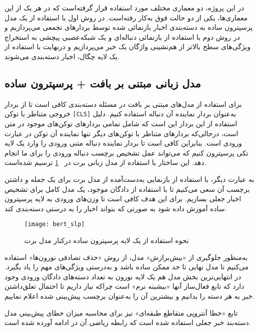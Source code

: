 در این پروژه، دو معماری مختلف مورد استفاده قرار گرفته‌است که در هر یک از این معماری‌ها، یکی از دو حالت فوق به‌کار رفته‌است. در روش اول با استفاده از یک مدل پرسپترون ساده به دسته‌بندی اخبار بازنمائی شده توسط بردار‌های تجمعی می‌پردازیم و در روش دوم با استفاده از بازنمائی دنباله‌ای و یک شبکه‌‌عصبی پیچشی به استخراج ویژگی‌های سطح بالاتر از هم‌نشینی واژگان یک خبر می‌پردازیم و درنهایت با استفاده از یک لایه چگال، اخبار دسته‌بندی می‌شوند.



\subsection{مدل زبانی مبتنی بر بافت + پرسپترون ساده}
برای استفاده از مدل‌‌های مبتنی بر بافت در مسئله دسته‌بندی کافی است تا از بردار خروجی متناظر با توکن \verb|[CLS]| به‌عنوان بردار نماینده آن دنباله استفاده کنیم. دلیل استفاده از این بردار این است که شامل تمامی بردارهای توکن‌های موجود در متن است، درحالی‌که بردارهای متناظر با توکن‌های دیگر تنها نماینده آن توکن در عبارت ورودی است. بنابراین کافی است تا بردار نماینده دنباله متنی ورودی را وارد یک لایه تکی پرسپترون کنیم که می‌تواند عمل تشخیص برچسب دنباله ورودی را برای ما انجام دهد. این ساختار با استفاده از مدل زبانی برت در \figurename~\ref{fig.bertSLP} ترسیم شده‌است.

به عبارت دیگر، با استفاده از بازنمایی به‌دست‌آمده از مدل برت برای یک جمله و داشتن برچسب آن سعی می‌کنیم تا با استفاده از  دادگان موجود، یک مدل کامل برای تشخیص اخبار جعلی بسازیم. برای این هدف کافی است تا وزن‌های ورودی به لایه پرسپترون  ساده آموزش داده شود به صورتی که بتواند اخبار را به درستی دسته‌بندی کند. 

\begin{figure}[!h]
\texttt{[image: bert\_slp]}
\centering
\caption{نحوه استفاده از یک لایه پرسپترون ساده درکنار مدل برت}
\label{fig.bertSLP}
\end{figure}
\noindent

به‌منظور جلوگیری از «بیش‌برازش» مدل، از روش «حذف تصادفی نورون‌ها» استفاده می‌کنیم تا مدل نهایی تا حد ممکن ساده باشد و به‌درستی ویژگی‌های مهم را یاد بگیرد. در انتهایی‌ترین بخش مدل هم یک لایه نورون به تعداد دسته‌های دادگان ورودی وجود دارد که تابع فعال‌ساز آنها «بیشینه نرم» است چراکه نیاز داریم تا احتمال تعلق‌داشتن خبر به هر دسته را بدانیم و بیشترین آن را به‌عنوان برچسب پیش‌بینی ‌شده اعلام نماییم.

تابع «خطا آنتروپی متقاطع طبقه‌ای» نیز برای محاسبه میزان خطای پیش‌بینی مدل دسته‌بند خبر جعلی استفاده شده ‌است که رابطه ریاضی آن در ادامه آورده شده است.

